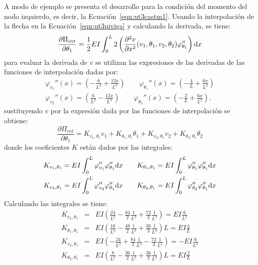 A modo de ejemplo se presenta el desarrollo para la condición del momento del nodo izquierdo, es decir, la Ecuación~\eqref{eqn:ut3castm1}. %
%
Usando la interpolación de la flecha en la Ecuación~\eqref{eqn:ut3piviga} y calculando la derivada, se tiene:
%
\begin{equation}
\frac{\partial \Pi_{int}}{\partial \theta_1} = \frac{1}{2} EI \int_0^{L} 2 \left( \frac{\partial^2 v}{\partial x^2} (v_1,\theta_1,v_2,\theta_2) \varphi_{\theta_1}'' \right) {\text{d}} x
\end{equation}
%
para evaluar la derivada de $v$ se utilizan las expresiones de las derivadas de las funciones de interpolación dadas por:
%
\begin{eqnarray}
	\varphi_{v_1}'' (x) = \left(- \frac{6}{L^{2}} + \frac{12 x}{L^{3}}\right) \qquad %
	\varphi_{\theta_1}'' (x) =	\left( - \frac{4}{L} + \frac{6 x }{L^{2}}\right) \\
	\varphi_{v_2}'' (x) =	\left(\frac{6}{L^{2}} - \frac{12 x}{L^{3}}\right) \qquad %
	\varphi_{\theta_2}'' (x) = \left(- \frac{2}{L} + \frac{6 x}{L^{2}}\right) .
\end{eqnarray}
%
sustituyendo $v$ por la expresión dada por las funciones de interpolación se obtiene:
%
\begin{equation}
\frac{\partial \Pi_{int}}{\partial \theta_1} = K_{v_1,\theta_1} v_1 + K_{\theta_1,\theta_1} \theta_1 + K_{v_2,\theta_1} v_2  + K_{\theta_2,\theta_1} \theta_2
\end{equation}
%
donde los coeficientes $K$ están dados por las integrales:
%
\begin{eqnarray}
K_{v_1,\theta_1} = EI \int_0^L \varphi_{v_1}'' \varphi_{\theta_1}'' \dif x \qquad
%
K_{\theta_1,\theta_1} = EI \int_0^L \varphi_{\theta_1}'' \varphi_{\theta_1}'' \dif x \\
%
K_{v_2,\theta_1} = EI \int_0^L \varphi_{v_2}'' \varphi_{\theta_1}'' \dif x \qquad 
%
K_{\theta_2,\theta_1} = EI\int_0^L \varphi_{\theta_2}'' \varphi_{\theta_1}'' \dif x 
\end{eqnarray}
%
Calculando las integrales se tiene:
%
\begin{eqnarray}
K_{v_1,\theta_1} &=& EI \left(   \frac{24}{L^2} -  \frac{84}{2} \frac{1}{L^2} + \frac{72}{3} \frac{1}{L^2} \right) = EI \frac{6}{L^2} \\
%
K_{\theta_1,\theta_1} &=& EI \left(   \frac{16}{L^2} -  \frac{48}{2}\frac{1}{L^2} +\frac{36}{3} \frac{1}{L^2}  \right) L = EI \frac{4}{L}\\
%
K_{v_2,\theta_1} &=& EI \left(  - \frac{24}{L^2} + \frac{84}{2} \frac{1}{L^2} - \frac{72}{3} \frac{1}{L^2} \right) = -EI \frac{6}{L^2} \\
%
K_{\theta_2,\theta_1} &=& EI \left(   \frac{8}{L^2} -  \frac{36}{2} \frac{1}{L^2} + \frac{36}{3} \frac{1}{L^2}  \right)L = EI \frac{2}{L}
\end{eqnarray}

